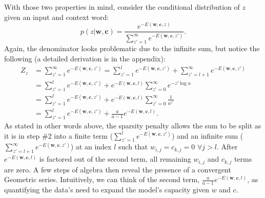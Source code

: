 \documentclass{article} %
\begin{document}
With those two properties in mind, consider the conditional distribution of $z$ given an input and context word: \begin{equation}
p(z | \mathbf{w}, \mathbf{c}) = \frac{e^{-E(\mathbf{w}, \mathbf{c}, z)}}{\sum_{z'=1}^{\infty} e^{-E(\mathbf{w}, \mathbf{c}, z')}}. \end{equation}  Again, the denominator looks problematic due to the infinite sum, but notice the following (a detailed derivation is in the appendix): \begin{equation}\begin{split}\label{z_finite}
Z_{z} &= \sum_{z'=1}^{\infty} e^{-E(\mathbf{w}, \mathbf{c}, z')}  = \sum_{z'=1}^{l} e^{-E(\mathbf{w}, \mathbf{c}, z')} + \sum_{z'=l+1}^{\infty} e^{-E(\mathbf{w}, \mathbf{c}, z')}  \\  &= \sum_{z'=1}^{l} e^{-E(\mathbf{w}, \mathbf{c}, z')} + e^{-E(\mathbf{w}, \mathbf{c}, l)} \sum_{z'=0}^{\infty} e^{  -z' \log a } \\ &= \sum_{z'=1}^{l} e^{-E(\mathbf{w}, \mathbf{c}, z')} + e^{-E(\mathbf{w}, \mathbf{c}, l)} \sum_{z'=0}^{\infty} \frac{1}{a^{  z' }} \\ &= \sum_{z'=1}^{l} e^{-E(\mathbf{w}, \mathbf{c}, z')} + \frac{a}{a-1}e^{-E(\mathbf{w}, \mathbf{c}, l)}.
\end{split}
\end{equation}  As stated in other words above, the sparsity penalty allows the sum to be split as it is in step \#2 into a finite term ($\sum_{z'=1}^{l} e^{-E(\mathbf{w}, \mathbf{c}, z')}$) and an infinite sum ($\sum_{z'=l+1}^{\infty} e^{-E(\mathbf{w}, \mathbf{c}, z')}$) at an index $l$ such that $w_{i,j}=c_{k,j}=0$ $\forall j>l$.  After $e^{-E(\mathbf{w}, \mathbf{c}, l)}$ is factored out of the second term, all remaining $w_{i,j}$ and $c_{k,j}$ terms are zero.  A few steps of algebra then reveal the presence of a convergent Geometric series.  Intuitively, we can think of the second term, $\frac{a}{a-1}e^{-E(\mathbf{w}, \mathbf{c}, l)}$, as quantifying the data's need to expand the model's capacity given $w$ and $c$.   
\end{document}
